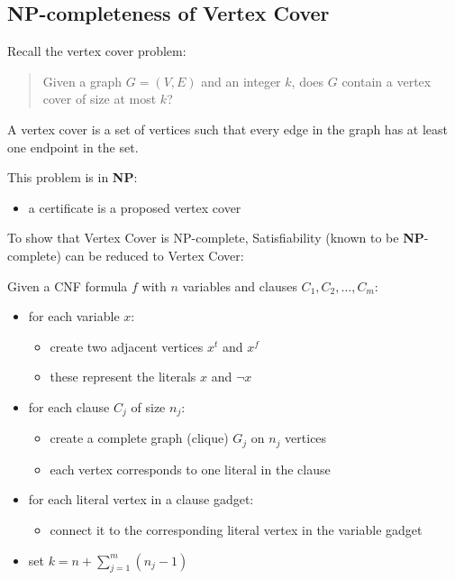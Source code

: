 \documentclass[11pt]{article}
\providecommand{\tightlist}{%
      \setlength{\itemsep}{0pt}\setlength{\parskip}{0pt}}
\begin{document}
    \subsection{\texorpdfstring{\textbf{NP}-completeness of Vertex
Cover}{NP-completeness of Vertex Cover}}\label{np-completeness-of-vertex-cover}

Recall the vertex cover problem:

\begin{quote}
Given a graph \(G=(V,E)\) and an integer \(k\), does \(G\) contain a
vertex cover of size at most \(k\)?
\end{quote}

A vertex cover is a set of vertices such that every edge in the graph
has at least one endpoint in the set.

This problem is in \textbf{NP}:

\begin{itemize}
\tightlist
\item
  a certificate is a proposed vertex cover
\end{itemize}

To show that Vertex Cover is NP-complete, Satisfiability (known to be
\textbf{NP}-complete) can be reduced to Vertex Cover:

Given a CNF formula \(f\) with \(n\) variables and clauses
\(C_1, C_2, \ldots, C_m\):

\begin{itemize}
\tightlist
\item
  for each variable \(x\):

  \begin{itemize}
  \tightlist
  \item
    create two adjacent vertices \(x^t\) and \(x^f\)
  \item
    these represent the literals \(x\) and \(\neg x\)
  \end{itemize}
\item
  for each clause \(C_j\) of size \(n_j\):

  \begin{itemize}
  \tightlist
  \item
    create a complete graph (clique) \(G_j\) on \(n_j\) vertices
  \item
    each vertex corresponds to one literal in the clause
  \end{itemize}
\item
  for each literal vertex in a clause gadget:

  \begin{itemize}
  \tightlist
  \item
    connect it to the corresponding literal vertex in the variable
    gadget
  \end{itemize}
\item
  set \(k = n + \sum_{j=1}^m (n_j - 1)\)
\end{itemize}
\end{document}
